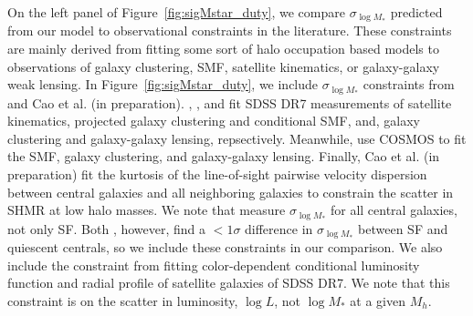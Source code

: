 \documentclass[12pt, letterpaper, preprint, tighten]{aastex62}
\begin{document}
On the left panel of Figure~\ref{fig:sigMstar_duty}, we compare 
$\sigma_{\log M_*}$ predicted from our model to observational 
constraints in the literature. These constraints are mainly derived from 
fitting some sort of halo occupation based models to observations of galaxy 
clustering, SMF, satellite kinematics, or galaxy-galaxy weak lensing. In 
Figure~\ref{fig:sigMstar_duty}, we include $\sigma_{\log M_*}$ constraints 
from~\cite{more2011, leauthaud2012, reddick2013, tinker2013, zu2015} and 
Cao et al. (in preparation). \cite{more2011}, \cite{reddick2013}, and \cite{zu2015} 
fit SDSS DR7 measurements of satellite kinematics, projected galaxy clustering and 
conditional SMF, and, galaxy clustering and galaxy-galaxy 
lensing, repsectively. Meanwhile, \cite{leauthaud2012, tinker2013} 
use COSMOS to fit the SMF, galaxy clustering, and galaxy-galaxy lensing. 
Finally, Cao et al. (in preparation) fit the kurtosis of the line-of-sight 
pairwise velocity dispersion between central galaxies and all neighboring 
galaxies to constrain the scatter in SHMR at low halo masses. We note that 
\cite{leauthaud2012, reddick2013, zu2015} measure $\sigma_{\log M_*}$ for 
all central galaxies, not only SF. Both \cite{more2011, tinker2013}, 
however, find a $< 1\sigma$ difference in $\sigma_{\log M_*}$ between SF 
and quiescent centrals, so we include these constraints in our comparison. 
We also include the \cite{lange2018a} constraint from fitting color-dependent 
conditional luminosity function and radial profile of satellite galaxies 
of SDSS DR7. We note that this constraint is on the scatter in luminosity, 
$\log L$, not $\log M_*$ at a given $M_h$. 
\end{document}
